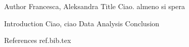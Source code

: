 Author Francesca, Aleksandra	
Title Ciao. almeno si spera

Introduction Ciao, ciao
Data
Analysis
Conclusion

References 
ref.bib.tex
